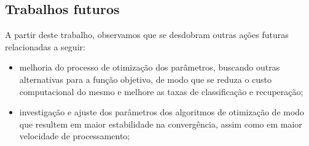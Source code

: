 \subsection{Trabalhos futuros}
A partir deste trabalho, observamos que se desdobram outras ações futuras relacionadas a seguir: 
\begin{itemize}

\item melhoria do processo de otimização dos parâmetros, buscando outras alternativas para a função objetivo, de modo que se reduza o custo computacional do mesmo e melhore as taxas de classificação e recuperação;

\item investigação e ajuste dos parâmetros dos algoritmos de otimização de modo que resultem em maior estabilidade na convergência, assim como em maior velocidade de processamento;

\end{itemize}

